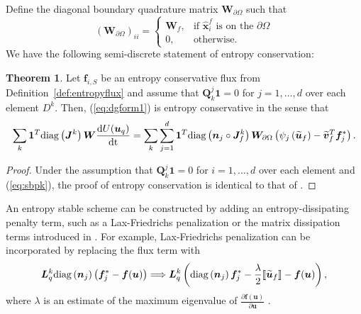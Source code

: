 \documentclass[preprint,10pt]{article}
\theoremstyle{definition}
\theoremstyle{lemma}
\theoremstyle{theorem}
\newtheorem{theorem}{Theorem}
\theoremstyle{assumption}
\renewcommand{\hat}{\widehat}
\renewcommand{\tilde}{\widetilde}
\newcommand{\td}[2]{\frac{{\rm d}#1}{{\rm d}{\rm #2}}}
\newcommand{\pd}[2]{\frac{\partial#1}{\partial#2}}
\newcommand{\LRp}[1]{\left( #1 \right)}
\newcommand{\LRs}[1]{\left[ #1 \right]}
\newcommand{\jump}[1] {\ensuremath{\llbracket#1\rrbracket}}
\newcommand{\note}[1]{{\color{blue}{#1}}}
\newcommand{\diag}[1]{{\rm diag}\LRp{#1}}
\begin{document}
{Define the diagonal boundary quadrature matrix $\bm{W}_{\partial \Omega}$ such that
\[
\LRp{\bm{W}_{\partial \Omega} }_{ii} = \begin{cases}
  \bm{W}_f, & \text{if $\hat{\bm{x}}^f_i$ is on the $\partial \Omega$}\\
0, & \text{otherwise}. 
\end{cases}
\]
We have the following semi-discrete statement of entropy conservation:
\begin{theorem}
  Let $\bm{f}_{i,S}$ be an entropy conservative flux from Definition~\ref{def:entropyflux} and assume that $\bm{Q}^j_k\bm{1} = 0$ for $j = 1,\ldots,d$ over each element $D^k$.  Then, (\ref{eq:dgform1}) is entropy conservative in the sense that
\[
  \sum_k \bm{1}^T\diag{\bm{J}^k}\bm{W}\td{U(\bm{u}_q)}{t} = \sum_k \sum_{j=1}^d \bm{1}^T\diag{\bm{n}_j\circ\bm{J}^k_f}\bm{W}_{\partial \Omega} \LRp{\psi_j\LRp{\tilde{\bm{u}}_f}-\tilde{\bm{v}}_f^T\bm{f}_j^*}.
\]
\label{thm:stab1}
\end{theorem}
\begin{proof}
Under the assumption that $\bm{Q}^j_k\bm{1} = 0$ for $i = 1,\ldots,d$ over each element and (\ref{eq:sbpk}), the proof of entropy conservation is identical to that of \cite{chan2017discretely}.  
\end{proof}
An entropy stable scheme can be constructed by adding an entropy-dissipating penalty term, such as a Lax-Friedrichs penalization or the matrix dissipation terms introduced in \cite{chandrashekar2013kinetic, winters2017uniquely}.  For example, Lax-Friedrichs penalization can be incorporated by replacing the flux term with
\[
\bm{L}^k_q \diag{\bm{n}_j} \LRp{\bm{f}_j^*-\bm{f}(\bm{u})} \Longrightarrow \bm{L}^k_q\LRp{\diag{\bm{n}_j} \bm{f}_j^* - \frac{\lambda}{2}\jump{\tilde{\bm{u}}_f}- \bm{f}(\bm{u})},
\]
where $\lambda$ is an estimate of the maximum eigenvalue of $\pd{\bm{f}(\bm{u})}{\bm{u}}$ \cite{chen2017entropy, chan2017discretely}.

}
\end{document}
